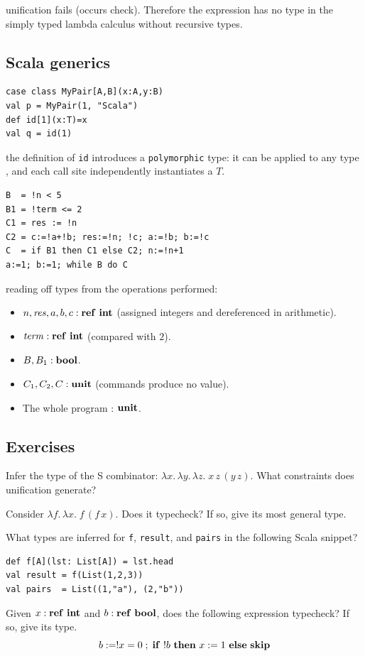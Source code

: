 unification fails (occurs check). Therefore the expression has no type in the simply typed lambda calculus without recursive types.

\subsection{Scala generics}
\begin{lstlisting}
case class MyPair[A,B](x:A,y:B)
val p = MyPair(1, "Scala")
def id[1](x:T)=x
val q = id(1)
\end{lstlisting}


the definition of \lstinline|id| introduces a \texttt{polymorphic} type: it can be applied to any type , and each call site independently instantiates a $T$.

\begin{lstlisting}
B  = !n < 5
B1 = !term <= 2
C1 = res := !n
C2 = c:=!a+!b; res:=!n; !c; a:=!b; b:=!c
C  = if B1 then C1 else C2; n:=!n+1
a:=1; b:=1; while B do C
\end{lstlisting}

reading off types from the operations performed:
\begin{itemize}
  \item $n, \mathit{res}, a, b, c : \mathbf{ref}\ \mathbf{int}$ (assigned integers and
        dereferenced in arithmetic).
  \item $\mathit{term} : \mathbf{ref}\ \mathbf{int}$ (compared with $2$).
  \item $B, B_1 : \mathbf{bool}$.
  \item $C_1, C_2, C : \mathbf{unit}$ (commands produce no value).
  \item The whole program : $\mathbf{unit}$.
\end{itemize}

\subsection{Exercises}
 
Infer the type of the S combinator:
$\lambda x.\,\lambda y.\,\lambda z.\; x\,z\,(y\,z)$.
What constraints does unification generate?
 
Consider $\lambda f.\,\lambda x.\; f\,(f\,x)$.  Does it typecheck?  If so,
give its most general type.
 
What types are inferred for \lstinline|f|, \lstinline|result|, and
\lstinline|pairs| in the following Scala snippet?
\begin{lstlisting}
def f[A](lst: List[A]) = lst.head
val result = f(List(1,2,3))
val pairs  = List((1,"a"), (2,"b"))
\end{lstlisting}

Given $x : \mathbf{ref}\ \mathbf{int}$ and $b : \mathbf{ref}\ \mathbf{bool}$, does the following
expression typecheck?  If so, give its type.
\[
  b := !x=0\;;\;\mathbf{if}\ !b\ \mathbf{then}\ x := 1\ \mathbf{else}\ \mathbf{skip}
\]





